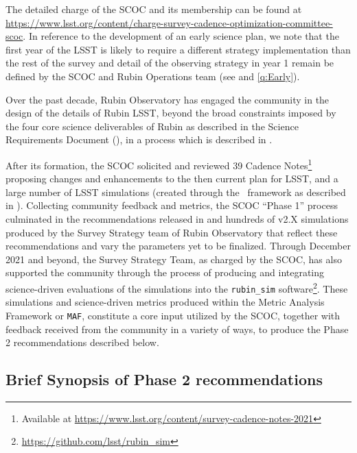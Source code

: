 The detailed charge of the SCOC and its membership can be found at \url{https://www.lsst.org/content/charge-survey-cadence-optimization-committee-scoc}. In reference to the development of an early science plan, we note that the first year of the LSST is likely to require a different strategy implementation than the rest of the survey and detail of the observing strategy in year 1 remain be defined by the SCOC and Rubin Operations team (see  and \autoref{q:Early}).

Over the past decade, Rubin Observatory has engaged the community in the design of the details of Rubin LSST, beyond the broad constraints imposed by the four core science deliverables of Rubin as described in the Science Requirements Document (), in a process which is described in \citet{2022ApJS..258....1B}. 

After its formation, the SCOC solicited %
and reviewed 39 Cadence Notes\footnote{\label{fn:cnotes}Available at \url{https://www.lsst.org/content/survey-cadence-notes-2021}} proposing changes and enhancements to the then current plan for LSST, and a large number of LSST simulations (created through the \opsim\ framework as described in ). Collecting community feedback and metrics, the SCOC ``Phase 1'' process culminated in the recommendations released in  and hundreds of v2.X simulations produced by the Survey Strategy team of Rubin Observatory that reflect these recommendations and vary the parameters yet to be finalized. 
Through December 2021 and beyond, the Survey Strategy Team, as charged by the SCOC, has also supported the community through the process of producing and integrating science-driven evaluations of the simulations into the \texttt{rubin\_sim} software\footnote{\url{https://github.com/lsst/rubin_sim}}. These simulations and science-driven metrics produced within the Metric Analysis Framework \citep{2014SPIE.9149E..0BJ} or \texttt{MAF},  constitute a core input utilized by the SCOC, together with feedback received from the community in a variety of ways, to produce the Phase 2 recommendations described below. 




\subsection{Brief Synopsis of Phase 2 recommendations}\label{sec:shortrec}

